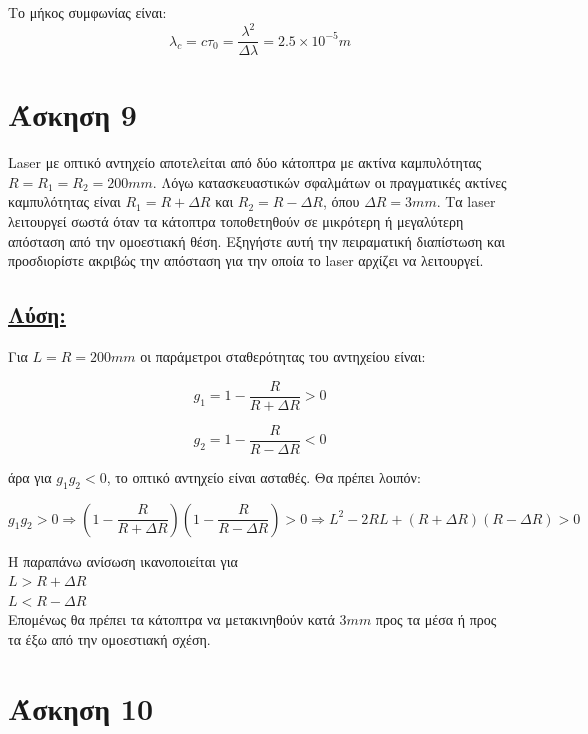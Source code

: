 \documentclass[a4paper,11pt,titlepage]{article}
\begin{document}
Το μήκος συμφωνίας είναι:
\begin{equation}
 \lambda_c=c\tau_0=\frac{\lambda^2}{\Delta\lambda}=2.5\times10^{-5}m
\end{equation}


\section{Άσκηση 9}

Laser με οπτικό αντηχείο αποτελείται από δύο κάτοπτρα με ακτίνα καμπυλότητας $R=R_1=R_2=200mm$. Λόγω κατασκευαστικών σφαλμάτων οι πραγματικές ακτίνες καμπυλότητας είναι $R_1=R+{\Delta}R$  και $R_2=R-{\Delta}R$, όπου ${\Delta}R=3mm$. Τα laser λειτουργεί σωστά όταν τα κάτοπτρα τοποθετηθούν σε μικρότερη ή μεγαλύτερη απόσταση από την ομοεστιακή θέση. Εξηγήστε αυτή την πειραματική διαπίστωση και προσδιορίστε ακριβώς την απόσταση για την οποία το laser αρχίζει να λειτουργεί.

\subsection*{\underline{Λύση:}}
Για $L=R=200mm$ οι παράμετροι σταθερότητας του αντηχείου είναι:


\begin{equation}
 g_1=1-\frac{R}{R+{\Delta}R}>0
\end{equation} 

 \begin{equation}
 g_2=1-\frac{R}{R-{\Delta}R}<0
\end{equation} 

άρα για $g_1g_2<0$, το οπτικό αντηχείο είναι ασταθές. Θα πρέπει λοιπόν:

\begin{equation}
 g_1g_2>0\Rightarrow(1-\frac{R}{R+{\Delta}R})(1-\frac{R}{R-{\Delta}R})>0\Rightarrow L^2-2RL+({R+{\Delta}R})({R-{\Delta}R})>0
\end{equation}

Η παραπάνω ανίσωση ικανοποιείται για \\

$L>R+\Delta R$ \\
$L<R-\Delta R$ \\

Επομένως θα πρέπει τα κάτοπτρα να μετακινηθούν κατά $3mm$ προς τα μέσα ή προς τα έξω από την ομοεστιακή σχέση.

\section{Άσκηση 10}
\end{document}
